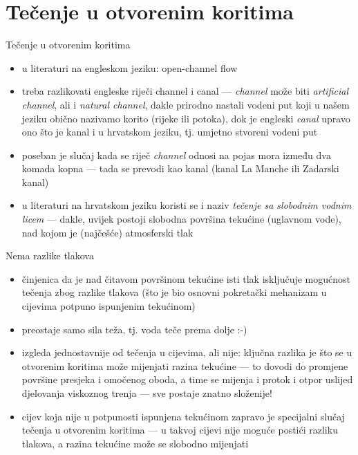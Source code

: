\documentclass{beamer}
\begin{document}
\naslovnislajd

\section{Tečenje u otvorenim koritima}
\begin{frame}{Tečenje u otvorenim koritima}

\begin{itemize}
\item u literaturi na engleskom jeziku: \alert{open-channel flow}
\item treba razlikovati engleske riječi \alert{channel} i \alert{canal}
--- \emph{channel} može biti \emph{artificial channel}, ali i \emph{natural
channel}, dakle prirodno nastali vodeni put koji u našem jeziku obično
nazivamo korito (rijeke ili potoka), dok je engleski \emph{canal}
upravo ono što je kanal i u hrvatskom jeziku, tj. umjetno stvoreni
vodeni put
\item poseban je slučaj kada se riječ\emph{ channel} odnosi na pojas mora
između dva komada kopna --- tada se prevodi kao kanal (kanal La Manche
ili Zadarski kanal)
\item u literaturi na hrvatskom jeziku koristi se i naziv \emph{tečenje
sa slobodnim vodnim licem} --- dakle, uvijek postoji slobodna površina
tekućine (uglavnom vode), nad kojom je (najčešće) atmosferski tlak
\end{itemize}
\end{frame}

\begin{frame}{Nema razlike tlakova}

\begin{itemize}
\item činjenica da je nad čitavom površinom tekućine isti tlak isključuje
mogućnost tečenja zbog razlike tlakova (što je bio osnovni pokretački
mehanizam u cijevima potpuno ispunjenim tekućinom)
\item preostaje samo sila teža, tj. voda teče prema dolje :-)
\item izgleda jednostavnije od tečenja u cijevima, ali nije: ključna razlika
je što se u otvorenim koritima može mijenjati razina tekućine ---
to dovodi do promjene površine presjeka i omočenog oboda, a time se
mijenja i protok i otpor uslijed djelovanja viskoznog trenja ---
sve postaje znatno složenije!
\item cijev koja nije u potpunosti ispunjena tekućinom zapravo je specijalni
slučaj tečenja u otvorenim koritima --- u takvoj cijevi nije moguće
postići razliku tlakova, a razina tekućine može se slobodno mijenjati
\end{itemize}
\end{frame}
\end{document}
